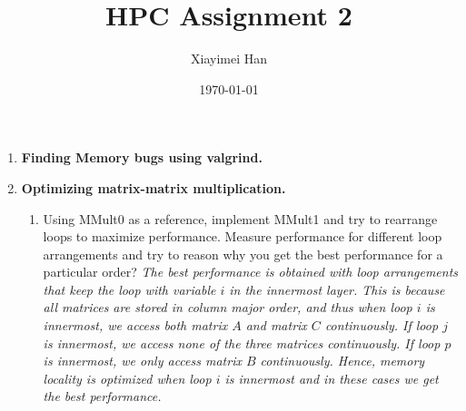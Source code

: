 \documentclass{article}
\title{HPC Assignment 2}
\author{Xiayimei Han}
\date{\today}
\begin{document}
\maketitle
\begin{enumerate}
    \item \textbf{Finding Memory bugs using valgrind.} 
    \item \textbf{Optimizing matrix-matrix multiplication.} 
    \begin{enumerate}
    \item Using MMult0 as a reference, implement MMult1 and try to rearrange loops to maximize performance. Measure performance for different loop arrangements and try to reason why you get the best performance for a particular order?
    \newline \textit{The best performance is obtained with loop arrangements that keep the loop with variable $i$ in the innermost layer. This is because all matrices are stored in column major order, and thus when loop $i$ is innermost, we access both matrix $A$ and matrix $C$ continuously. If loop $j$ is innermost, we access none of the three matrices continuously. If loop $p$ is innermost, we only access matrix $B$ continuously. Hence, memory locality is optimized when loop $i$ is innermost and in these cases we get the best performance.} 
    

\end{enumerate}
\end{enumerate}
\end{document}
